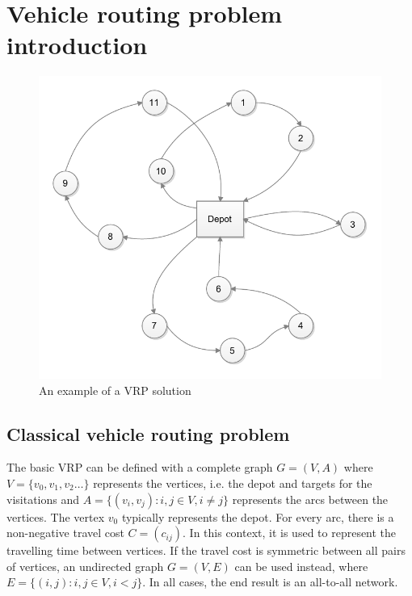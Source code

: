 \chapter{Vehicle routing problem introduction}
\label{chapter:background} 

\begin{figure}[h]
  \begin{center}
    \includegraphics{images/vrpbasic.pdf}
    \caption{An example of a VRP solution}
    \label{fig:simplenetwork}
  \end{center}
\end{figure}

\section{Classical vehicle routing problem}



The basic VRP can be defined with a complete graph $G = (V, A)$ where $V = \{v_0, v_1, v_2 \dots\}$ represents the vertices, i.e. the depot and targets for the visitations and $A = \{(v_i, v_j): i, j \in V, i \neq j \}$ represents the arcs between the vertices. The vertex $v_0$ typically represents the depot. For every arc, there is a non-negative travel cost $C=(c_{ij})$. In this context, it is used to represent the travelling time between vertices. If the travel cost is symmetric between all pairs of vertices, an undirected graph $G = (V, E)$ can be used instead, where $E=\{(i, j) : i, j \in V, i < j\}$. In all cases, the end result is an all-to-all network. \cite{laporte2007you} 

